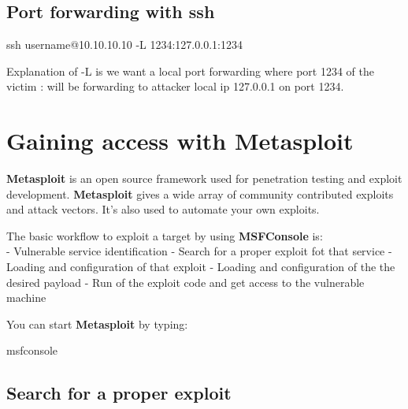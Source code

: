 \documentclass{assets/ipesethesis}
\newenvironment{Shaded}{\begin{snugshade}}{\end{snugshade}}
\newcommand{\ExtensionTok}[1]{#1}
\newcommand{\FunctionTok}[1]{\textcolor[rgb]{0.00,0.00,0.00}{#1}}
\newcommand{\NormalTok}[1]{#1}
\begin{document}
\hypertarget{port-forwarding-with-ssh}{%
\section*{Port forwarding with ssh}\label{port-forwarding-with-ssh}}

\begin{Shaded}
\begin{Highlighting}[]
\FunctionTok{ssh}\NormalTok{ username@10.10.10.10 -L 1234:127.0.0.1:1234}
\end{Highlighting}
\end{Shaded}

Explanation of -L is we want a local port forwarding where port 1234 of the victim : will be forwarding to attacker local ip 127.0.0.1 on port 1234.

\hypertarget{gaining-access-with-metasploit}{%
\chapter*{Gaining access with Metasploit}\label{gaining-access-with-metasploit}}

\textbf{Metasploit} is an open source framework used for penetration testing and exploit development. \textbf{Metasploit} gives a wide array of
community contributed exploits and attack vectors. It's also used to automate your own exploits.

The basic workflow to exploit a target by using \textbf{MSFConsole} is:\\
- Vulnerable service identification
- Search for a proper exploit fot that service
- Loading and configuration of that exploit
- Loading and configuration of the the desired payload
- Run of the exploit code and get access to the vulnerable machine

You can start \textbf{Metasploit} by typing:

\begin{Shaded}
\begin{Highlighting}[]
\ExtensionTok{msfconsole}
\end{Highlighting}
\end{Shaded}

\hypertarget{search-for-a-proper-exploit}{%
\section*{Search for a proper exploit}\label{search-for-a-proper-exploit}}
\end{document}
